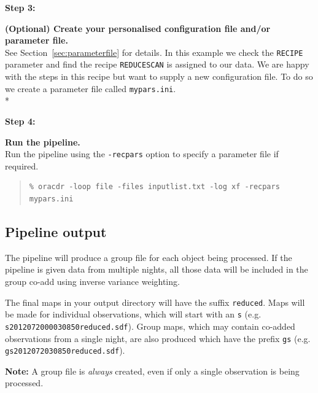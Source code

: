 \documentclass[twoside,11pt]{article}
\newcommand{\htmlref}[2]{#1}
\newcommand{\latexhtml}[2]{#1}
\newcommand{\xlabel}[1]{}
\renewcommand{\_}{\texttt{\symbol{95}}}
\newenvironment{myquote}{\begin{quote}\begin{small}}{\end{small}\end{quote}}
\newcommand{\drrecipe}[1]{\texttt{#1}}
\newcommand{\param}[1]{\texttt{#1}}
\newcommand{\cref}[3]{\latexhtml{#1~\ref{#2}}{\htmlref{#3}{#2}}}
\begin{document}
\begin{minipage}[t]{0.15\linewidth}
\textbf{Step 3:}
\end{minipage}
\begin{minipage}[t]{0.85\linewidth}
\textbf{(Optional) Create your personalised configuration file and/or parameter file.} \\
See \cref{Section}{sec:parameterfile}{Changing the defaults} for
details. In this example we check the \param{RECIPE} parameter and find the
recipe \drrecipe{REDUCE\_SCAN} is assigned to our data. We are happy with the
steps in this recipe but want to supply a new configuration file. To
do so we create a parameter file called \texttt{mypars.ini}.\\*

\end{minipage}


\begin{minipage}[t]{0.15\linewidth}
\textbf{Step 4:}
\end{minipage}
\begin{minipage}[t]{0.85\linewidth}
\textbf{Run the pipeline.} \\Run the pipeline using the
\texttt{-recpars} option to specify a parameter file if required.
\begin{myquote}
\begin{verbatim}
% oracdr -loop file -files inputlist.txt -log xf -recpars mypars.ini
\end{verbatim}
\end{myquote}
\end{minipage}


\subsection{\xlabel{pl_output}Pipeline output}

The pipeline will produce a group file for each object being
processed. If the pipeline is given data from multiple nights, all
those data will be included in the group co-add using inverse variance
weighting.

The final maps in your output directory will have the suffix
\texttt{\_reduced}. Maps will be made for individual observations,
which will start with an \texttt{s} (e.g.
\texttt{s20120720\_00030\_850\_reduced.sdf}). Group maps, which may contain
co-added observations from a single night, are also produced which
have the prefix \texttt{gs} (e.g. \texttt{gs20120720\_30\_850\_reduced.sdf}).

\textbf{Note:} A group file is \emph{always} created, even if only a single
observation is being processed.
\end{document}
